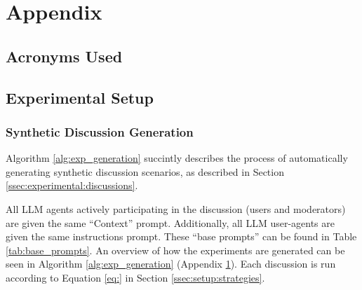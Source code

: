 \section{Appendix}
\label{sec:appendix}

\subsection{Acronyms Used}

\begin{acronym}[WWW] %
\end{acronym}


\subsection{Experimental Setup}

\subsubsection{Synthetic Discussion Generation}

Algorithm \ref{alg:exp_generation} succintly describes the process of automatically generating synthetic discussion scenarios, as described in Section \ref{ssec:experimental:discussions}.

All \ac{LLM} agents actively participating in the discussion (users and moderators) are given the same “Context” prompt. Additionally, all \ac{LLM} user-agents are given the same instructions prompt. These “base prompts” can be found in Table \ref{tab:base_prompts}. An overview of how the experiments are generated can be seen in Algorithm \ref{alg:exp_generation} (Appendix \ref{sec:appendix}). Each discussion is run according to Equation \ref{eq:} in Section \ref{ssec:setup:strategies}. 


